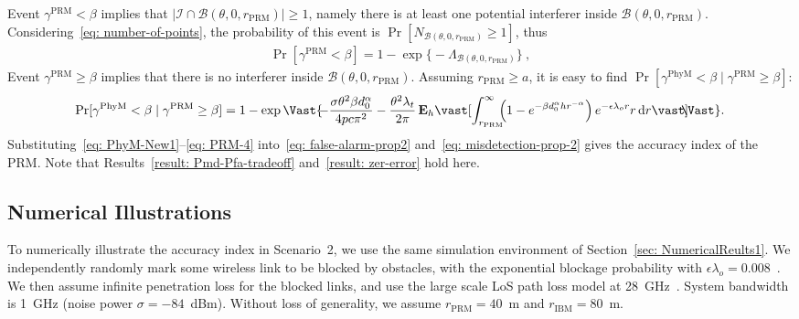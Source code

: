 \documentclass[12pt, draftclsnofoot, onecolumn]{IEEEtran}
\begin{document}
Event $\gamma^{\mathrm{PRM}} < \beta$ implies that ${\left| \mathcal{I} \cap \mathcal{B}(\theta,0,r_{\mathrm{PRM}}) \right| \geq 1}$, namely there is at least one potential interferer inside $\mathcal{B}(\theta,0,r_{\mathrm{PRM}})$. Considering~\eqref{eq: number-of-points}, the probability of this event is ${\Pr [N_{\mathcal{B}(\theta,0,r_{\mathrm{PRM}})} \geq 1]}$, thus
\begin{align}\label{eq: PRM-3}
\Pr \left[\gamma^{\mathrm{PRM}} < \beta \right] = 1 - \exp\Big\{-\Lambda_{\mathcal{B}(\theta,0,r_{\mathrm{PRM}})} \Big\} \:,
\end{align}
Event $\gamma^{\mathrm{PRM}} \geq \beta$ implies that there is no interferer inside $\mathcal{B}(\theta,0,r_{\mathrm{PRM}})$. Assuming $r_{\mathrm{PRM}} \geq a$, it is easy to find $\Pr[\gamma^{\mathrm{PhyM}} < \beta \mid \gamma^{\mathrm{PRM}} \geq \beta]$:
\begin{equation}\label{eq: PRM-4}
\Pr[\gamma^{\mathrm{PhyM}} < \beta \mid \gamma^{\mathrm{PRM}} \geq \beta] = 1 - \exp\Vast\{\hspace{-1mm}- \frac{\sigma \theta^2 \beta d_{0}^{\alpha}}{4 pc\pi^2} - \frac{\theta^2 \lambda_t}{2 \pi } \, \mathbf{E}_h \vast[\int_{r_{\mathrm{PRM}}}^{\infty}\hspace{-2mm} \left( 1 - e^{- \beta d_{0}^{\alpha} h r^{-\alpha}} \right) e^{-\epsilon\lambda_o r} r \, \mathrm{d}r \vast]\hspace{-2mm} \Vast\} .
\end{equation}
Substituting~\eqref{eq: PhyM-New1}--\eqref{eq: PRM-4} into~\eqref{eq: false-alarm-prop2} and~\eqref{eq: misdetection-prop-2} gives the accuracy index of the PRM. Note that Results~\ref{result: Pmd-Pfa-tradeoff} and~\ref{result: zer-error} hold here.

\subsection{Numerical Illustrations}\label{sec: NumericalResult2}
To numerically illustrate the accuracy index in Scenario~2, we use the same simulation environment of Section~\ref{sec: NumericalReults1}. We independently randomly mark some wireless link to be blocked by obstacles, with the exponential blockage probability with $\epsilon \lambda_o = 0.008$~\cite{TBai2014Blockage}. We then assume infinite penetration loss for the blocked links, and use the large scale LoS path loss model at 28~GHz~\cite[Table~I]{Akdeniz2014MillimeterWave}. System bandwidth is 1~GHz (noise power $\sigma = -84$~dBm). Without loss of generality, we assume $r_{\text{PRM}} = 40$~m and $r_{\text{IBM}} = 80$~m.
\end{document}
